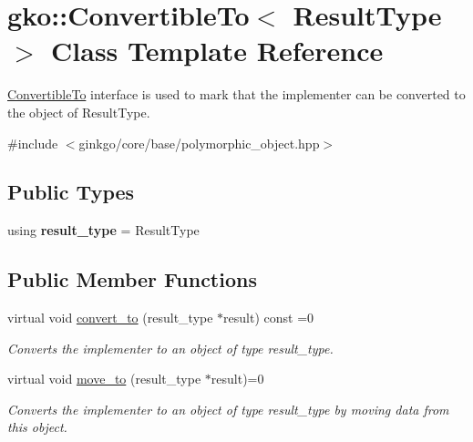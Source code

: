 \hypertarget{classgko_1_1ConvertibleTo}{}\section{gko\+:\+:Convertible\+To$<$ Result\+Type $>$ Class Template Reference}
\label{classgko_1_1ConvertibleTo}


\hyperlink{classgko_1_1ConvertibleTo}{Convertible\+To} interface is used to mark that the implementer can be converted to the object of Result\+Type.  




{\ttfamily \#include $<$ginkgo/core/base/polymorphic\+\_\+object.\+hpp$>$}

\subsection*{Public Types}
\begin{DoxyCompactItemize}
\item 
\mbox{\label{classgko_1_1ConvertibleTo_a96d1c9f59700620c31fca1062f57de92}} 
using {\bfseries result\+\_\+type} = Result\+Type
\end{DoxyCompactItemize}
\subsection*{Public Member Functions}
\begin{DoxyCompactItemize}
\item 
virtual void \hyperlink{classgko_1_1ConvertibleTo_aa7f3420babcbed39ee15bc020bed4f7e}{convert\+\_\+to} (result\+\_\+type $\ast$result) const =0
\begin{DoxyCompactList}\small\item\em Converts the implementer to an object of type result\+\_\+type. \end{DoxyCompactList}\item 
virtual void \hyperlink{classgko_1_1ConvertibleTo_ab9047c7c49e0f83c79b54c0034d6197b}{move\+\_\+to} (result\+\_\+type $\ast$result)=0
\begin{DoxyCompactList}\small\item\em Converts the implementer to an object of type result\+\_\+type by moving data from this object. \end{DoxyCompactList}\end{DoxyCompactItemize}


